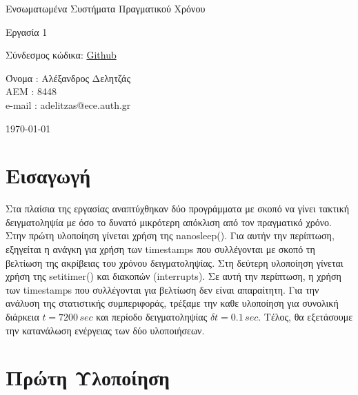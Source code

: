 \documentclass[a4paper,12pt]{article}
\newcommand{\en}{\selectlanguage{english}}
\newcommand{\gr}{\selectlanguage{greek}}
\begin{document}
\begin{titlepage}
	\begin{center}
		\vspace*{5cm}
		
		{\LARGE Ενσωματωμένα Συστήματα Πραγματικού Χρόνου} \\		
		\vspace{1cm}
		
		{\Large Εργασία 1} \\
		\vspace{5cm}
		
		\begin{large}
			Σύνδεσμος κώδικα: \href{https://github.com/AlexDelitzas/embedded-systems-course}{\textlatin{Github}} \\
		\end{large}
		\vspace{4cm}
		\begin{large}
			Όνομα : Αλέξανδρος Δελητζάς \\
			ΑΕΜ : 8448 \\
			\en
			e-mail : adelitzas@ece.auth.gr \\
			\gr
		\end{large}
		
		\vfill
		\today
		
	\end{center}
\end{titlepage}


\newpage

\section{Εισαγωγή}
Στα πλαίσια της εργασίας αναπτύχθηκαν δύο προγράμματα με σκοπό να γίνει τακτική δειγματοληψία με όσο το δυνατό μικρότερη απόκλιση από τον πραγματικό χρόνο. Στην πρώτη υλοποίηση γίνεται χρήση της \textlatin{nanosleep()}. Για αυτήν την περίπτωση, εξηγείται η ανάγκη για χρήση των \textlatin{timestamps} που συλλέγονται με σκοπό τη βελτίωση της ακρίβειας του χρόνου δειγματοληψίας. Στη δεύτερη υλοποίηση γίνεται χρήση της \textlatin{setitimer()} και διακοπών (\textlatin{interrupts}). Σε αυτή την περίπτωση, η χρήση των \textlatin{timestamps} που συλλέγονται για βελτίωση δεν είναι απαραίτητη. Για την ανάλυση της στατιστικής συμπεριφοράς, τρέξαμε την καθε υλοποίηση για συνολική διάρκεια $t=7200 \, sec$ και περίοδο δειγματοληψίας $\delta t=0.1 \, sec$. Τέλος, θα εξετάσουμε την κατανάλωση ενέργειας των δύο υλοποιήσεων.

\section{Πρώτη Υλοποίηση}
\end{document}
